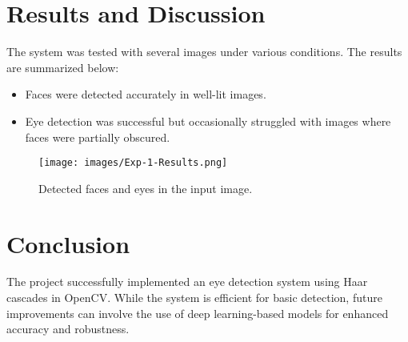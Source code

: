 \documentclass{report}
\begin{document}
\section{Results and Discussion}
The system was tested with several images under various conditions. The results are summarized below:
\begin{itemize}
    \item Faces were detected accurately in well-lit images.
    \item Eye detection was successful but occasionally struggled with images where faces were partially obscured.
\end{itemize}

\begin{figure}[h!]
    \centering
    \texttt{[image: images/Exp-1-Results.png]} %
    \caption{Detected faces and eyes in the input image.}
    \label{fig:output}
\end{figure}

\section{Conclusion}
The project successfully implemented an eye detection system using Haar cascades in OpenCV. While the system is efficient for basic detection, future improvements can involve the use of deep learning-based models for enhanced accuracy and robustness.
\end{document}
